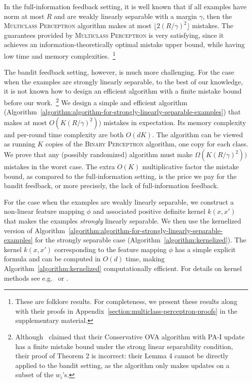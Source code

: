 In the full-information feedback setting, it is well known
\citep{Crammer-Singer-2003} that if all examples have norm at most $R$ and are
weakly linearly separable with a margin $\gamma$, then the \textsc{Multiclass
Perceptron} algorithm makes at most $\lfloor 2(R/\gamma)^2 \rfloor$ mistakes.
The guarantees provided by \textsc{Multiclass Perceptron} is very satisfying,
since it achieves an information-theoretically optimal mistake upper bound,
while having low time and memory complexities.~\footnote{These are
folklore results. For completeness, we present these results along
with their proofs in Appendix~\ref{section:multiclass-perceptron-proofs} in the
supplementary material.}

The bandit feedback setting, however, is much more challenging. For the case
when the examples are strongly linearly separable, to the best of our knowledge,
it is not known how to design an efficient algorithm with a finite mistake bound
before our work.~\footnote{Although~\cite{Chen-Chen-Zhang-Chen-Zhang-2009}
claimed that their Conservative OVA algorithm with PA-I update has a finite
mistake bound under the strong linear separability condition, their proof of
Theorem 2 is incorrect: their Lemma 4 cannot be directly applied to the bandit
setting, as the algorithm only makes updates on a subset of the $w_i$'s.} We
design a simple and efficient algorithm
(Algorithm~\ref{algorithm:algorithm-for-strongly-linearly-separable-examples})
that makes at most $O(K (R/\gamma)^2))$ mistakes in expectation. Its memory
complexity and per-round time complexity are both $O(dK)$. The algorithm can be
viewed as running $K$ copies of the \textsc{Binary Perceptron} algorithm, one
copy for each class. We prove that any (possibly randomized) algorithm must make
$\Omega(K (R/\gamma)^2))$ mistakes in the worst case. The extra $O(K)$
multiplicative factor the mistake bound, as compared to the full-information
setting, is the price we pay for the bandit feedback, or more precisely, the
lack of full-information feedback.

For the case when the examples are weakly linearly separable, we construct a
non-linear feature mapping $\phi$ and associated positive definite kernel
$k(x,x')$ that makes the examples \emph{strongly} linearly separable. We then
use the kernelized version of
Algorithm~\ref{algorithm:algorithm-for-strongly-linearly-separable-examples} for
the strongly separable case (Algorithm~\ref{algorithm:kernelized}). The kernel
$k(x,x')$ corresponding to the feature mapping $\phi$ has a simple explicit
formula and can be computed in $O(d)$ time, making
Algorithm~\ref{algorithm:kernelized} computationally efficient. For details on
kernel methods see e.g.~\citet{Scholkopf-Smola-2002} or
\citet{Shawe-Taylor-Cristianini-2004}.

